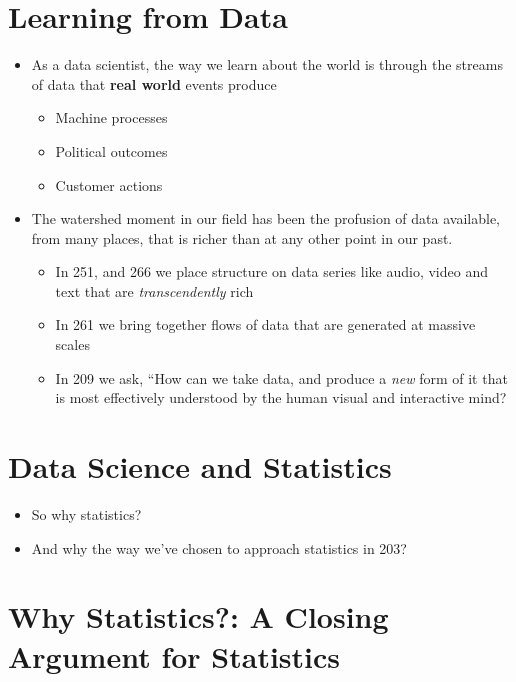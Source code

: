 \documentclass[
  letterpaper,
  DIV=11,
  numbers=noendperiod]{scrreprt}
\providecommand{\tightlist}{%
  \setlength{\itemsep}{0pt}\setlength{\parskip}{0pt}}\usepackage{longtable,booktabs,array}
\begin{document}
\section{Learning from Data}\label{learning-from-data}

\begin{itemize}
\tightlist
\item
  As a data scientist, the way we learn about the world is through the
  streams of data that \textbf{real world} events produce

  \begin{itemize}
  \tightlist
  \item
    Machine processes
  \item
    Political outcomes
  \item
    Customer actions
  \end{itemize}
\item
  The watershed moment in our field has been the profusion of data
  available, from many places, that is richer than at any other point in
  our past.

  \begin{itemize}
  \tightlist
  \item
    In 251, and 266 we place structure on data series like audio, video
    and text that are \emph{transcendently} rich
  \item
    In 261 we bring together flows of data that are generated at massive
    scales
  \item
    In 209 we ask, ``How can we take data, and produce a \emph{new} form
    of it that is most effectively understood by the human visual and
    interactive mind?
  \end{itemize}
\end{itemize}

\section{Data Science and Statistics}\label{data-science-and-statistics}

\begin{itemize}
\tightlist
\item
  So why statistics?
\item
  And why the way we've chosen to approach statistics in 203?
\end{itemize}

\section{Why Statistics?: A Closing Argument for
Statistics}\label{why-statistics-a-closing-argument-for-statistics}
\end{document}

